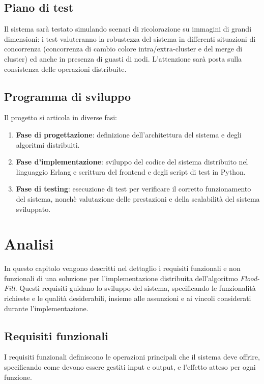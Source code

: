 \documentclass[12pt, a4paper]{report}
\begin{document}
\section{Piano di test}

Il sistema sar\`a testato simulando scenari di ricolorazione su immagini di grandi dimensioni: i test valuteranno la robustezza del sistema in differenti situazioni di concorrenza (concorrenza di cambio colore intra/extra-cluster e del merge di cluster) ed anche in presenza di guasti di nodi. L'attenzione sar\`a posta sulla consistenza delle operazioni distribuite.

\section{Programma di sviluppo}

Il progetto si articola in diverse fasi:
\begin{enumerate}
    \item \textbf{Fase di progettazione}: definizione dell'architettura del sistema e degli algoritmi distribuiti.
    \item \textbf{Fase d'implementazione}: sviluppo del codice del sistema distribuito nel linguaggio Erlang e scrittura del frontend e degli script di test in Python.
    \item \textbf{Fase di testing}: esecuzione di test per verificare il corretto funzionamento del sistema, nonch\`e valutazione delle prestazioni e della scalabilit\`a del sistema sviluppato.
\end{enumerate}

\chapter{Analisi}\label{chapter:analisi}

In questo capitolo vengono descritti nel dettaglio i requisiti funzionali e non funzionali di una soluzione per l'implementazione distribuita dell'algoritmo \emph{Flood-Fill}. Questi requisiti guidano lo sviluppo del sistema, specificando le funzionalit\`a richieste e le qualit\`a desiderabili, insieme alle assunzioni e ai vincoli considerati durante l'implementazione.

\section{Requisiti funzionali}

I requisiti funzionali definiscono le operazioni principali che il sistema deve offrire, specificando come devono essere gestiti input e output, e l'effetto atteso per ogni funzione.
\end{document}
